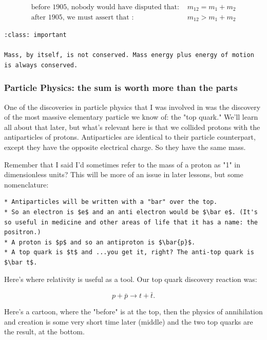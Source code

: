 \documentclass[
]{article}
\begin{document}
\begin{align*}
\text{before 1905, nobody would have disputed that: } &m_{12} = m_1 + m_2 \\
\text{after 1905, we must assert that : } &m_{12} > m_1 + m_2
\end{align*}

\begin{verbatim}
:class: important

Mass, by itself, is not conserved. Mass energy plus energy of motion is always conserved.
\end{verbatim}

\hypertarget{particle-physics-the-sum-is-worth-more-than-the-parts}{%
\subsubsection{Particle Physics: the sum is worth more than the
parts}\label{particle-physics-the-sum-is-worth-more-than-the-parts}}

One of the discoveries in particle physics that I was involved in was
the discovery of the most massive elementary particle we know of: the
"top quark." We'll learn all about that later, but what's relevant here
is that we collided protons with the antiparticles of protons.
Antiparticles are identical to their particle counterpart, except they
have the opposite electrical charge. So they have the same mass.

Remember that I said I'd sometimes refer to the mass of a proton as "1"
in dimensionless units? This will be more of an issue in later lessons,
but some nomenclature:

\begin{verbatim}
* Antiparticles will be written with a "bar" over the top.
* So an electron is $e$ and an anti electron would be $\bar e$. (It's so useful in medicine and other areas of life that it has a name: the positron.)
* A proton is $p$ and so an antiproton is $\bar{p}$.
* A top quark is $t$ and ...you get it, right? The anti-top quark is $\bar t$.
\end{verbatim}

Here's where relativity is useful as a tool. Our top quark discovery
reaction was:

\[p + \bar{p} \to t + \bar{t}. \nonumber\]

Here's a cartoon, where the "before" is at the top, then the physics of
annihilation and creation is some very short time later (middle) and the
two top quarks are the result, at the bottom.
\end{document}
